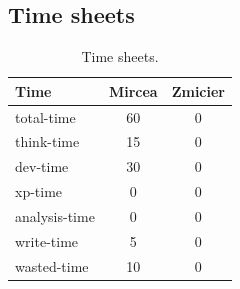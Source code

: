 \documentclass[conference]{IEEEtran}
\begin{document}

\appendix

\subsection{Time sheets}
\begin{table}[ht]
\begin{center}
  \begin{tabular}{ | l | c | c | }
    \hline
    \textbf{Time} & \textbf{Mircea} & \textbf{Zmicier} \\ \hline
    total-time & 60 & 0 \\ \hline
    think-time & 15 & 0 \\ \hline
    dev-time & 30 & 0 \\ \hline
    xp-time & 0 & 0 \\ \hline
    analysis-time & 0 & 0 \\ \hline
    write-time & 5 & 0 \\ \hline
    wasted-time & 10 & 0 \\
    \hline
  \end{tabular}
  \caption{Time sheets.}
\end{center}
\end{table}



%
%
%




\end{document}
